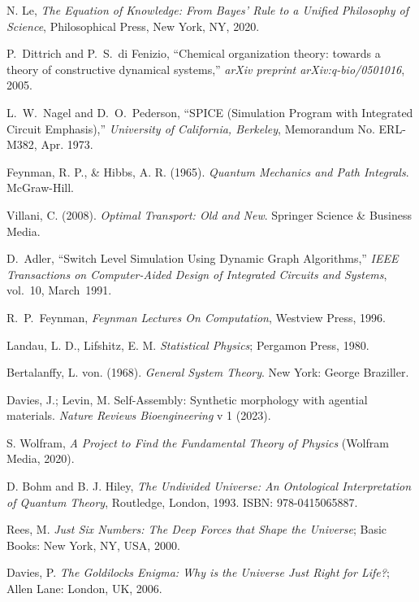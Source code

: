 \documentclass[preprint,12pt]{elsarticle}
\begin{document}
\begin{thebibliography}{999}
 N. Le, \textit{The Equation of Knowledge: From Bayes’ Rule to a Unified Philosophy of Science}, Philosophical Press, New York, NY, 2020.

P.~Dittrich and P.~S.~di Fenizio, ``Chemical organization theory: towards a theory of constructive dynamical systems,'' \emph{arXiv preprint arXiv:q-bio/0501016}, 2005.


L.~W.~Nagel and D.~O.~Pederson, ``SPICE (Simulation Program with Integrated Circuit Emphasis),'' 
{\em University of California, Berkeley}, Memorandum No. ERL-M382, Apr. 1973.

Feynman, R. P., \& Hibbs, A. R. (1965). \textit{Quantum Mechanics and Path Integrals}. McGraw-Hill.

Villani, C. (2008). \textit{Optimal Transport: Old and New}. Springer Science \& Business Media.


 D.~Adler, ``Switch Level Simulation Using Dynamic Graph Algorithms,''
{\em IEEE Transactions on Computer-Aided Design of Integrated Circuits and Systems}, vol.~10, March~1991.

R.~P.~Feynman, {\em Feynman Lectures On Computation}, Westview Press, 1996.

Landau, L. D., Lifshitz, E. M. \textit{Statistical Physics}; Pergamon Press, 1980.

Bertalanffy, L. von. (1968). \textit{General System Theory}. New York: George Braziller.

Davies, J.; Levin, M. Self-Assembly: Synthetic morphology with agential materials. \textit{Nature Reviews Bioengineering} v 1 (2023).

 S. Wolfram, \textit{A Project to Find the Fundamental Theory of Physics} (Wolfram Media, 2020).

D. Bohm and B. J. Hiley, \emph{The Undivided Universe: An Ontological Interpretation of Quantum Theory}, Routledge, London, 1993. ISBN: 978-0415065887.

Rees, M. \textit{Just Six Numbers: The Deep Forces that Shape the Universe}; Basic Books: New York, NY, USA, 2000.

Davies, P. \textit{The Goldilocks Enigma: Why is the Universe Just Right for Life?}; Allen Lane: London, UK, 2006.


\end{thebibliography}
\end{document}
